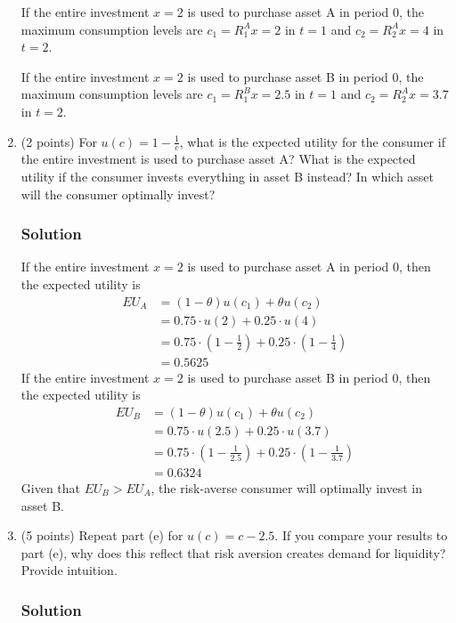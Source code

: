 \documentclass[12pt]{article}
\begin{document}
\begin{enumerate}[label=(\alph*)]
    If the entire investment $x=2$ is used to purchase asset A in period 0, the  maximum consumption levels are $c_1 = R_{1}^Ax = 2$ in $t=1$ and $c_2 = R_{2}^Ax = 4$ in $t=2$. 

    If the entire investment $x=2$ is used to purchase asset B in period 0, the  maximum consumption levels are $c_1 = R_{1}^Bx = 2.5$ in $t=1$ and $c_2 = R_{2}^Ax = 3.7$ in $t=2$. 


    \item (2 points) For $u(c) = 1 - \frac{1}{c}$, what is the expected utility for the consumer if the entire investment is used to purchase asset A? 
    What is the expected utility if the consumer invests everything in asset B instead? In which asset will the consumer optimally invest?
    \subsubsection*{Solution}

    If the entire investment $x=2$ is used to purchase asset A in period 0, then the expected utility is
    \begin{align*}
        EU_A &= (1 - \theta)u(c_1) + \theta u(c_2)
        \\ &= 0.75 \cdot u(2) + 0.25 \cdot u(4)
        \\ &= 0.75 \cdot  \left(1 - \frac{1}{2}\right) + 0.25 \cdot \left(1 - \frac{1}{4}\right)
        \\ &= 0.5625
    \end{align*}
    If the entire investment $x=2$ is used to purchase asset B in period 0, then the expected utility  is
    \begin{align*}
        EU_B &= (1 - \theta)u(c_1) + \theta u(c_2)
        \\ &= 0.75 \cdot u(2.5) + 0.25 \cdot u(3.7)
        \\ &= 0.75 \cdot  \left(1 - \frac{1}{2.5}\right) + 0.25 \cdot \left(1 - \frac{1}{3.7}\right)
        \\ &= 0.6324
    \end{align*}
    Given that $EU_B > EU_A$,  the risk-averse consumer will optimally invest in asset B.

    \item (5 points) Repeat part (e) for $u(c) = c - 2.5$. If you compare your results to part (e), why does this reflect that risk aversion creates demand for liquidity? Provide intuition.
    \subsubsection*{Solution}


\end{enumerate}
\end{document}
